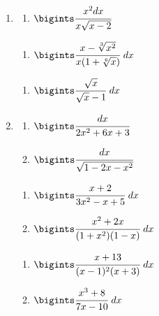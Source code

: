 \documentclass{article}
\begin{document}
\begin{multicols}{2}
\begin{enumerate}[label=\Roman*.]
		\item
		\begin{multicols}{3}
			\begin{enumerate}[label=\arabic*.]
				\setlength\itemsep{1em}
				\item $\bigints\cfrac{x^2dx}{x\sqrt{x - 2}}$
			\end{enumerate}
			\vfill\null\columnbreak
			\begin{enumerate}[label=\arabic*., start=2]
				\setlength\itemsep{1em}
				\item $\bigints\cfrac{x-\sqrt[3]{x^2}}{x(1 + \sqrt[6]{x})}\ dx$
			\end{enumerate}
			\vfill\null\columnbreak
			\begin{enumerate}[label=\arabic*., start=3]
				\setlength\itemsep{1em}
				\item $\bigints\cfrac{\sqrt{x}}{\sqrt{x}-1}\ dx$
			\end{enumerate}
			\vfill\null\columnbreak
		\end{multicols}
		
		\item
		\begin{multicols}{3}
			\begin{enumerate}[label=\arabic*.]
				\setlength\itemsep{1em}
				\item $\bigints\cfrac{dx}{2x^2 +6x + 3}$
				\item $\bigints\cfrac{dx}{\sqrt{1 - 2x - x^2}}$
			\end{enumerate}
			\vfill\null\columnbreak
			\begin{enumerate}[label=\arabic*., start=3]
				\setlength\itemsep{1em}
				\item $\bigints\cfrac{x+2}{3x^2-x+5}\ dx$
				\item $\bigints\cfrac{x^2+2x}{(1+x^2)(1-x)}\ dx$
			\end{enumerate}
			\vfill\null\columnbreak
			\begin{enumerate}[label=\arabic*., start=5]
				\setlength\itemsep{1em}
				\item $\bigints\cfrac{x+13}{(x-1)^2(x+3)}\ dx$
				\item $\bigints\cfrac{x^3 + 8}{7x-10}\ dx$
			\end{enumerate}
			\vfill\null\columnbreak
		\end{multicols}
		

\end{enumerate}
\end{multicols}
\end{document}
